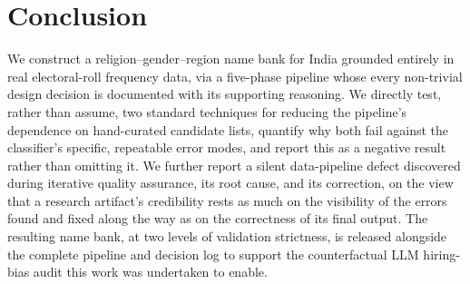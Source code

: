 \documentclass[11pt]{article}
\begin{document}
\section{Conclusion}

We construct a religion--gender--region name bank for India grounded entirely in real electoral-roll frequency data, via a five-phase pipeline whose every non-trivial design decision is documented with its supporting reasoning. We directly test, rather than assume, two standard techniques for reducing the pipeline's dependence on hand-curated candidate lists, quantify why both fail against the classifier's specific, repeatable error modes, and report this as a negative result rather than omitting it. We further report a silent data-pipeline defect discovered during iterative quality assurance, its root cause, and its correction, on the view that a research artifact's credibility rests as much on the visibility of the errors found and fixed along the way as on the correctness of its final output. The resulting name bank, at two levels of validation strictness, is released alongside the complete pipeline and decision log to support the counterfactual LLM hiring-bias audit this work was undertaken to enable.



\end{document}
